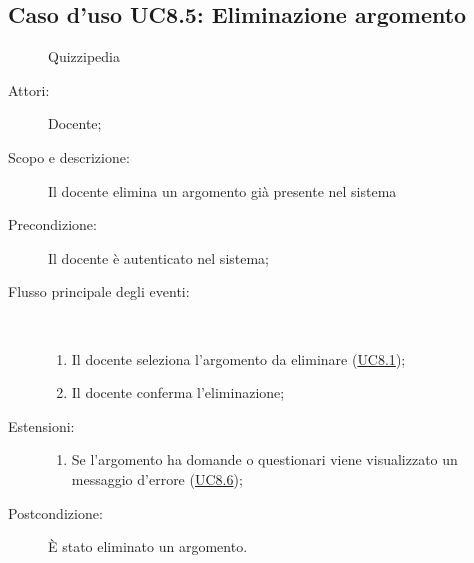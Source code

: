\subsection{Caso d'uso UC8.5: Eliminazione argomento}
	\begin{figure}[H]
		\centering
		\begin{resizedtikzpicture}{\textwidth}
		\begin{umlsystem}[x=0, fill=lightgray!20]{Quizzipedia}
		\end{umlsystem}
		\end{resizedtikzpicture}
		\caption{}
	\end{figure}
\begin{description}
\item[Attori:] Docente;
\item[Scopo e descrizione:] Il docente elimina un argomento già presente nel sistema
      \item[Precondizione:] Il docente è autenticato nel sistema;

        \item[Flusso principale degli eventi:] \ 
 \begin{enumerate}
          \item Il docente seleziona l'argomento da eliminare (\hyperlink{UC8.1}{UC8.1});
          \item Il docente conferma l'eliminazione;

      \end{enumerate}
    \item[Estensioni:]
      \begin{enumerate}
          \item Se l'argomento ha domande o questionari viene visualizzato un messaggio d'errore (\hyperlink{UC8.6}{UC8.6});

      \end{enumerate}
    \item[Postcondizione:] È stato eliminato un argomento.
  \end{description}
\hypertarget{UC8.6}{}

